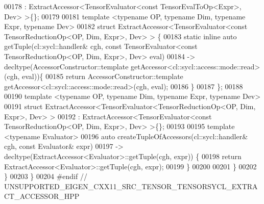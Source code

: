\begin{DoxyCode}
00178 : ExtractAccessor<TensorEvaluator<const TensorEvalToOp<Expr>, Dev> >\{\};
00179 
00181 \textcolor{keyword}{template} <\textcolor{keyword}{typename} OP, \textcolor{keyword}{typename} Dim, \textcolor{keyword}{typename} Expr, \textcolor{keyword}{typename} Dev>
00182 \textcolor{keyword}{struct }ExtractAccessor<TensorEvaluator<const TensorReductionOp<OP, Dim, Expr>, Dev> > \{
00183   \textcolor{keyword}{static} \textcolor{keyword}{inline} \textcolor{keyword}{auto} getTuple(cl::sycl::handler& cgh, \textcolor{keyword}{const} TensorEvaluator<\textcolor{keyword}{const} TensorReductionOp<OP,
       Dim, Expr>, Dev> eval)
00184   -> decltype(AccessorConstructor::template getAccessor<cl::sycl::access::mode::read>(cgh, eval))\{
00185     \textcolor{keywordflow}{return} AccessorConstructor::template getAccessor<cl::sycl::access::mode::read>(cgh, eval);
00186   \}
00187 \};
00188 
00190 \textcolor{keyword}{template} <\textcolor{keyword}{typename} OP, \textcolor{keyword}{typename} Dim, \textcolor{keyword}{typename} Expr, \textcolor{keyword}{typename} Dev>
00191 \textcolor{keyword}{struct }ExtractAccessor<TensorEvaluator<TensorReductionOp<OP, Dim, Expr>, Dev> >
00192 : ExtractAccessor<TensorEvaluator<const TensorReductionOp<OP, Dim, Expr>, Dev> >\{\};
00193 
00195 \textcolor{keyword}{template} <\textcolor{keyword}{typename} Evaluator>
00196 \textcolor{keyword}{auto} createTupleOfAccessors(cl::sycl::handler& cgh, \textcolor{keyword}{const} Evaluator& expr)
00197 -> decltype(ExtractAccessor<Evaluator>::getTuple(cgh, expr)) \{
00198   \textcolor{keywordflow}{return} ExtractAccessor<Evaluator>::getTuple(cgh, expr);
00199 \}
00200 
00201 \} 
00202 \} 
00203 \} 
00204 \textcolor{preprocessor}{#endif  // UNSUPPORTED\_EIGEN\_CXX11\_SRC\_TENSOR\_TENSORSYCL\_EXTRACT\_ACCESSOR\_HPP}
\end{DoxyCode}
